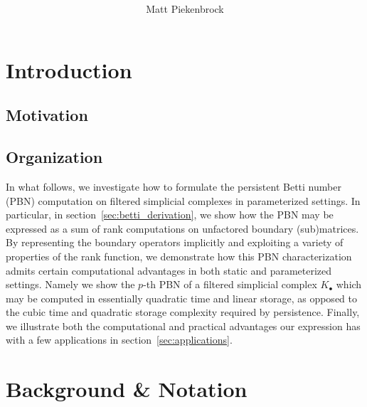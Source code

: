 \documentclass[10pt]{article}
\title{\vspace{-2.0em} \vspace{-0.5em}}
\author{Matt Piekenbrock}
\date{}
\newcommand{\+}{%
	\raisebox{0.18ex}{\scaleobj{0.55}{+}}
}
\begin{document}
\noindent



\section{Introduction}
\subsection*{Motivation}

%


\subsection{Organization}

In what follows, we investigate how to formulate the persistent Betti number (PBN) computation on filtered simplicial complexes in parameterized settings. 
In particular, in section~\ref{sec:betti_derivation}, we show how the PBN may be expressed as a sum of rank computations on unfactored boundary (sub)matrices. 
By representing the boundary operators implicitly and exploiting a variety of properties of the rank function, we demonstrate how this PBN characterization admits certain computational advantages in both static and parameterized settings. 
Namely we show the $p$-th PBN of a filtered simplicial complex $K_\bullet$ which may be computed in essentially quadratic time and linear storage, as opposed to the cubic time and quadratic storage complexity required by persistence.
Finally, we illustrate both the computational and practical advantages our expression has with a few applications in section~\ref{sec:applications}. 


\section{Background \& Notation}\label{sec:background_notation}

\end{document}
